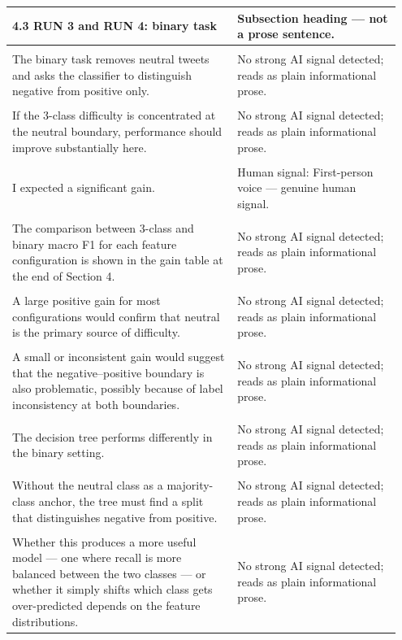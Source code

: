 \documentclass[11pt]{article}
\begin{document}
\begin{longtable}{|p{0.55\linewidth}|p{0.40\linewidth}|}
\hline
4.3 RUN 3 and RUN 4: binary task & Subsection heading --- not a prose sentence. \\[2pt]
\hline
\rule{0pt}{3.5cm} & \\
\hline
The binary task removes neutral tweets and asks the classifier to distinguish negative from positive only. & No strong AI signal detected; reads as plain informational prose. \\[2pt]
\hline
\rule{0pt}{3.5cm} & \\
\hline
If the 3-class difficulty is concentrated at the neutral boundary, performance should improve substantially here. & No strong AI signal detected; reads as plain informational prose. \\[2pt]
\hline
\rule{0pt}{3.5cm} & \\
\hline
I expected a significant gain. & Human signal: First-person voice --- genuine human signal. \\[2pt]
\hline
\rule{0pt}{3.5cm} & \\
\hline
The comparison between 3-class and binary macro F1 for each feature configuration is shown in the gain table at the end of Section 4. & No strong AI signal detected; reads as plain informational prose. \\[2pt]
\hline
\rule{0pt}{3.5cm} & \\
\hline
A large positive gain for most configurations would confirm that neutral is the primary source of difficulty. & No strong AI signal detected; reads as plain informational prose. \\[2pt]
\hline
\rule{0pt}{3.5cm} & \\
\hline
A small or inconsistent gain would suggest that the negative--positive boundary is also problematic, possibly because of label inconsistency at both boundaries. & No strong AI signal detected; reads as plain informational prose. \\[2pt]
\hline
\rule{0pt}{3.5cm} & \\
\hline
The decision tree performs differently in the binary setting. & No strong AI signal detected; reads as plain informational prose. \\[2pt]
\hline
\rule{0pt}{3.5cm} & \\
\hline
Without the neutral class as a majority-class anchor, the tree must find a split that distinguishes negative from positive. & No strong AI signal detected; reads as plain informational prose. \\[2pt]
\hline
\rule{0pt}{3.5cm} & \\
\hline
Whether this produces a more useful model --- one where recall is more balanced between the two classes --- or whether it simply shifts which class gets over-predicted depends on the feature distributions. & No strong AI signal detected; reads as plain informational prose. \\[2pt]

\end{longtable}
\end{document}
